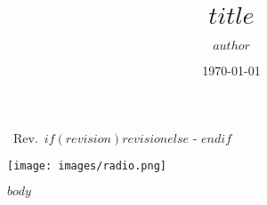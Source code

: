 \documentclass[11pt]{report}
\author{$author$}
\title{$title$}
\date{\today}
\makeatletter
\let\thetitle\@title
\def \currentrevision{$if(revision)$$revision$$else$ - $endif$}
\makeatother
\begin{document}
\pagestyle{TitlePages}

\begin{center}
    {\LARGE \thetitle}

    \vspace{0.3cm}

    {\Large ~Rev.~\currentrevision}

    \vspace{1cm}
\end{center}

\vspace{6cm}

\texttt{[image: images/radio.png]}

\newpage

\pagestyle{General}

$body$


\end{document}
